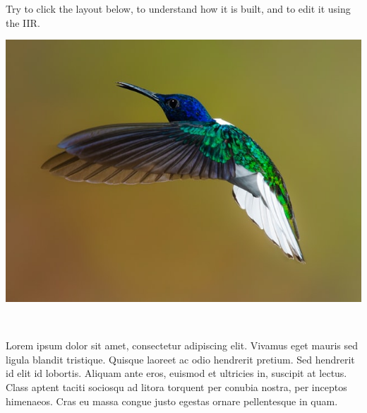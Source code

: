 \documentclass[11pt, a4paper]{article}
\begin{document}

\begin{example}
    Try to click the layout below, to understand how it is built, and to edit it using the IIR.

    \begin{gridlayout}{\textwidth}{11cm}
        \begin{row}{0.65}
            \begin{cell}{0.65}
                \includegraphics[width=\cellwidth]{img/bird.jpg}
            \end{cell}
            \begin{cell}{0.05}
                ~
            \end{cell}
            \begin{cell}{0.3}
                Lorem ipsum dolor sit amet, consectetur adipiscing elit. Vivamus eget mauris sed ligula blandit tristique. Quisque laoreet ac odio hendrerit pretium. Sed hendrerit id elit id lobortis. Aliquam ante eros, euismod et ultricies in, suscipit at lectus. Class aptent taciti sociosqu ad litora torquent per conubia nostra, per inceptos himenaeos. Cras eu massa congue justo egestas ornare pellentesque in quam.
            \end{cell}
        \end{row}

\end{gridlayout}
\end{example}
\end{document}
